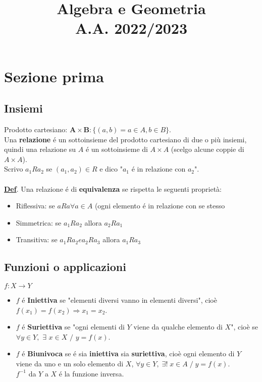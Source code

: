 \documentclass[12pt]{article}
\title{
    \textbf{Algebra e Geometria}\\
    \large A.A. 2022/2023
}
\date{}
\begin{document}
\begin{multicols*}{2}
\tableofcontents
\end{multicols*}


\maketitle

\section{Sezione prima}

\subsection{Insiemi}
Prodotto cartesiano: $ \boldsymbol{A \times B}: \{(a,b) = a \in A, b \in B\}$. \\
Una \textbf{relazione} é un sottoinsieme del prodotto cartesiano di due o più insiemi, quindi una relazione su $A$ é un sottoinsieme di $A \times A$ (scelgo alcune coppie di $A \times A$).\\
Scrivo $a_{1}Ra_{2}$ se $(a_{1}, a_{2})\in R$ e dico "$a_{1}$ é in relazione con $a_{2}$".\\\\
\underline{\textbf{Def}}. Una relazione é di \textbf{equivalenza} se rispetta le seguenti proprietà:

\begin{itemize}
    \item Riflessiva: se $aRa \forall a\in A$ (ogni elemento é in relazione con se stesso
    \item Simmetrica: se $a_{1}Ra_{2}$ allora $a_{2}Ra_{1}$
    \item Transitiva: se $a_{1}Ra_{2} e a_{2}Ra_{3}$ allora $a_{1}Ra_{3}$
\end{itemize}

\subsection{Funzioni o applicazioni}
$f : X \longrightarrow Y$

\begin{itemize}
    \item $f$ é \textbf{Iniettiva} se "elementi diversi vanno in elementi diversi", cioè $f(x_{1}) = f(x_{2}) \Rightarrow x_{1} = x_{2}$.
    \item $f$ é \textbf{Suriettiva} se "ogni elementi di $Y$ viene da qualche elemento di $X$", cioè se $\forall y\in Y,$ $\exists$ $ x\in X$ $/$ $ y = f(x)$.
    \item $f$ é \textbf{Biunivoca} se é sia \textbf{iniettiva} sia \textbf{suriettiva}, cioè ogni elemento di $Y$ viene da uno e un solo elemento di $X$, $\forall y \in Y, \;\exists! \; x \in A \;/\; y = f(x)$.\\
    $f^{-1}$ da $Y$ a $X$ é la funzione inversa.
\end{itemize}
\end{document}
